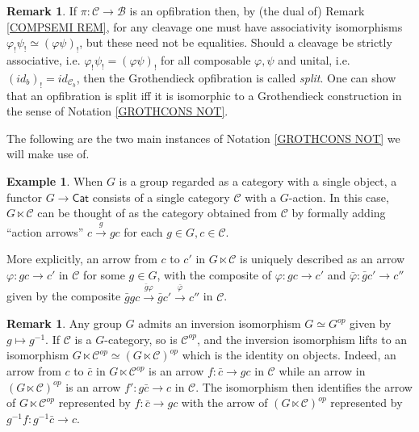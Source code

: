 \documentclass[a4paper,10pt
,draft
]{article}%
\numberwithin{equation}{section}
\numberwithin{figure}{section}
\theoremstyle{definition} %
\newtheorem{example}[equation]{Example}%
\newtheorem{remark}[equation]{Remark}%
\newcommand{\C}{\ensuremath{\mathcal C}}
\newcommand{\1}{\ensuremath{\mathbbm 1}}%
\begin{document}
\begin{remark}\label{SPLITOPFIB REM}
	If $\pi \colon \mathcal{C} \to \mathcal{B}$
	is an opfibration then, by (the dual of) Remark \ref{COMPSEMI REM},
	for any cleavage one must have associativity isomorphisms
	$\varphi_! \psi_! \simeq \left(\varphi \psi\right)_!$,
	but these need not be equalities.
	Should a cleavage be strictly associative, i.e. 
	$\varphi_! \psi_! = \left(\varphi \psi\right)_!$
	for all composable $\varphi,\psi$
	and unital, i.e.
	$(id_b)_! = id_{\mathcal{C}_b}$,
	then the Grothendieck opfibration is called \emph{split}.
	One can show that an opfibration is split iff it is isomorphic to a Grothendieck construction in the sense of Notation \ref{GROTHCONS NOT}.
\end{remark}


The following are the two main instances of 
Notation \ref{GROTHCONS NOT} we will make use of.



\begin{example}\label{GLTIMES EQ}
	When $G$ is a group regarded as a category with a single object,
	a functor
	$G \to \mathsf{Cat}$
	consists of a single category $\C$ with a $G$-action.
	In this case, $G \ltimes \mathcal{C}$
	can be thought of as the category obtained from $\mathcal{C}$
	by formally adding ``action arrows''
	$c \xrightarrow{g} gc$ for each $g\in G,c\in \mathcal{C}$.
	
	More explicitly, an arrow from $c$ to $c'$
	in $G \ltimes \mathcal{C}$
	is uniquely described as an arrow
	$\varphi \colon gc \to c'$ in $\mathcal{C}$ for some $g \in G$,
	with the composite of 
	$\varphi \colon gc \to c'$
	and
	$\bar{\varphi} \colon \bar{g}c' \to c''$
	given by
	the composite
	$ \bar{g}g c \xrightarrow{\bar{g} \varphi} \bar{g}c' \xrightarrow{\bar{\varphi}} c''$ in $\C$.
\end{example}




\begin{remark}\label{INVLTIMES REM}
	Any group $G$ admits an inversion isomorphism
	$G \simeq G^{op}$ given by $g \mapsto g^{-1}$.
	If $\mathcal{C}$ is a $G$-category, 
	so is $\mathcal{C}^{op}$,
	and the inversion isomorphism lifts
	to an isomorphism
	$G \ltimes \mathcal{C}^{op} \simeq \left(G \ltimes \mathcal{C}\right)^{op}$ which is the identity on objects.
	Indeed, an arrow from $c$ to $\bar{c}$
	in $G \ltimes \mathcal{C}^{op}$
	is an arrow $f \colon \bar{c} \to gc$ in $\mathcal{C}$
	while an arrow in $\left(G \ltimes \mathcal{C}\right)^{op}$
	is an arrow
	$f' \colon g \bar{c} \to c$ in $\mathcal{C}$.
	The isomorphism then identifies 
	the arrow of $G \ltimes \mathcal{C}^{op}$
	represented by
	$f \colon \bar{c} \to gc$ 
	with the arrow of $\left(G \ltimes \mathcal{C}\right)^{op}$
	represented by
	$g^{-1}f \colon g^{-1}\bar{c} \to c$.
\end{remark}
\end{document}
